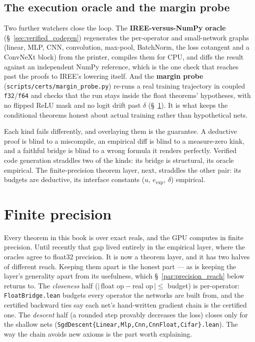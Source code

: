 \subsection{The execution oracle and the margin probe}

Two further watchers close the loop. The \textbf{IREE-versus-NumPy
oracle} (\S~\ref{sec:verified_codegen}) regenerates the per-operator and
small-network graphs (linear, MLP, CNN, convolution, max-pool, BatchNorm,
the loss cotangent and a ConvNeXt block) from the printer, compiles them
for CPU, and diffs the result against an independent NumPy reference,
which is the one check that reaches past the proofs to IREE's lowering
itself. And the
\textbf{margin probe} (\texttt{scripts/certs/\allowbreak margin\_probe.py}) re-runs a real
training trajectory in coupled \texttt{f32}/\texttt{f64} and checks that
the run stays inside the float theorems' hypotheses, with no flipped ReLU
mask and no logit drift past \(\delta\) (\S~\ref{sec:precision}). It is
what keeps the conditional theorems honest about actual training rather
than hypothetical nets.

\bigskip

Each kind fails differently, and overlaying them is the guarantee. A
deductive proof is blind to a miscompile, an empirical diff is blind to a
measure-zero kink, and a faithful bridge is blind to a wrong formula it
renders perfectly. Verified code generation straddles two
of the kinds: its bridge is structural, its oracle empirical. The
finite-precision theorem layer, next, straddles the other pair: its
budgets are deductive, its interface constants (\(u\), \(e_{\exp}\),
\(\delta\)) empirical.

\section{Finite precision}
\label{sec:precision}

Every theorem in this book is over exact reals, and the GPU computes in
finite precision. Until recently that gap lived entirely in the empirical
layer, where the oracles agree to float32 precision. It is now a theorem layer, and
it has two halves of different reach. Keeping them apart is the honest
part --- as is keeping the layer's generality apart from its
usefulness, which \S~\ref{par:precision_reach} below returns to.
The \emph{closeness} half
(\(|\,\text{float op} - \text{real op}\,| \le\) budget) is
per-operator: \texttt{FloatBridge.lean} budgets every operator the
networks are built from, and the certified backward ties say each net's
hand-written gradient chain is the certified one. The
\emph{descent} half (a rounded step provably decreases the loss)
closes only for the shallow nets
(\texttt{SgdDescent\{Linear,Mlp,Cnn,CnnFloat,Cifar\}.lean}). The way the chain avoids
new axioms is the part worth explaining.

